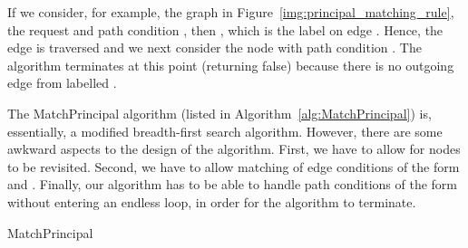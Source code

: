 \documentclass{article}
\begin{document}
If we consider, for example, the graph in Figure~\ref{img:principal_matching_rule}, the request  and path condition , then , which is the label on edge .
Hence, the edge is traversed and we next consider the node  with path condition .
The algorithm terminates at this point (returning false) because there is no outgoing edge from  labelled .

The \textsf{MatchPrincipal} algorithm (listed in Algorithm~\ref{alg:MatchPrincipal}) is, essentially, a modified breadth-first search algorithm.
However, there are some awkward aspects to the design of the algorithm.
First, we have to allow for nodes to be revisited.
Second, we have to allow matching of edge conditions of the form  and .
Finally, our algorithm has to be able to handle path conditions of the form  without entering an endless loop, in order for the algorithm to terminate.

\begin{algorithm}[!h]\footnotesize
    \caption{\textsf{MatchPrincipal}}
    \label{alg:MatchPrincipal}
    \begin{algorithmic}[1]
          	\STATE{}
                    \IF{}
                        \STATE{}
                        \STATE{}
                    \ENDIF
                    \IF{}
                        \STATE{}
                    \ENDIF
                        \IF{}
                            \STATE{}
                        \ENDIF
                    \ENDIF
                \ENDFOR
                    \IF{}
                        \STATE{}
                        \STATE{}
                    \ENDIF
                    \IF{}
                        \STATE{}
                    \ENDIF
                        \IF{}
                            \STATE{}
                        \ENDIF
                    \ENDIF
                \ENDFOR
                    \IF{}
                        \IF{}
                            \IF{}
       		                   \RETURN{\TRUE} 
                            \ENDIF
                        \ELSE
                            \STATE{}
                        \ENDIF
                    \ENDIF
                \ENDFOR
            \ENDWHILE
            \RETURN{\FALSE} 
    \end{algorithmic}
\end{algorithm}
\end{document}
